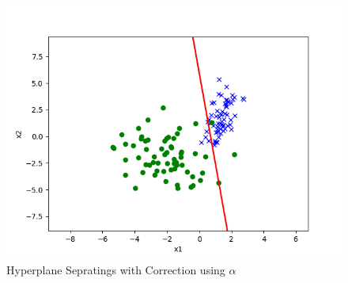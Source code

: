 \begin{answer}
	\begin{figure}[h!]
\centering
  \includegraphics[width=.7\linewidth]{posonly/posonly_adjusted_pred.png}
\caption{Hyperplane Sepratings with Correction using $\alpha$}
\label{fig:test}
\end{figure}
\end{answer}